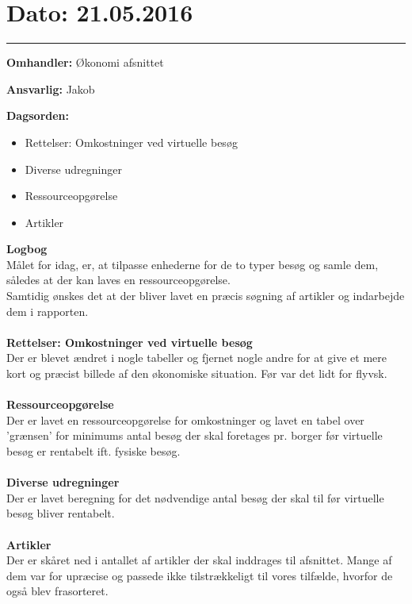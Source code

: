 \section{Dato: 21.05.2016}
\hrule

\textbf{Omhandler:} Økonomi afsnittet

\textbf{Ansvarlig:} Jakob

\textbf{Dagsorden:}
\begin{itemize}
	\item Rettelser: Omkostninger ved virtuelle besøg
	\item Diverse udregninger
	\item Ressourceopgørelse
	\item Artikler
\end{itemize}

\textbf{Logbog}
\\
Målet for idag, er, at tilpasse enhederne for de to typer besøg og samle dem, således at der kan laves en ressourceopgørelse.\\
Samtidig ønskes det at der bliver lavet en præcis søgning af artikler og indarbejde dem i rapporten. 
\\ \\

\textbf{Rettelser: Omkostninger ved virtuelle besøg}
\\
Der er blevet ændret i nogle tabeller og fjernet nogle andre for at give et mere kort og præcist billede af den økonomiske situation. Før var det lidt for flyvsk. 
\\ \\

\textbf{Ressourceopgørelse}
\\
Der er lavet en ressourceopgørelse for omkostninger og lavet en tabel over 'grænsen' for minimums antal besøg der skal foretages pr. borger før virtuelle besøg er rentabelt ift. fysiske besøg.
\\ \\

\textbf{Diverse udregninger}
\\
Der er lavet beregning for det nødvendige antal besøg der skal til før virtuelle besøg bliver rentabelt.
\\ \\



\textbf{Artikler}
\\
Der er skåret ned i antallet af artikler der skal inddrages til afsnittet. Mange af dem var for upræcise og passede ikke tilstrækkeligt til vores tilfælde, hvorfor de også blev frasorteret.

\\ \\